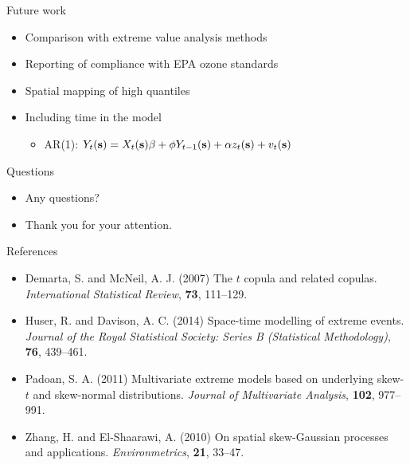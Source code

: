 \documentclass{beamer}
\begin{document}
\begin{frame}{Future work}
  \begin{itemize} \setlength{\itemsep}{0.5em}
    \item Comparison with extreme value analysis methods
    \item Reporting of compliance with EPA ozone standards
    \item Spatial mapping of high quantiles
    \item Including time in the model
    \begin{itemize}
      \item AR(1): $Y_t(\mbox{\bf s}) = X_t(\mbox{\bf s}) \beta + \phi Y_{t-1}(\mbox{\bf s}) + \alpha z_t(\mbox{\bf s}) + v_t(\mbox{\bf s})$
    \end{itemize}
  \end{itemize}
\end{frame}

\begin{frame}{Questions}
  \begin{itemize} \setlength{\itemsep}{0.5em}
    \item Any questions?
    \item Thank you for your attention.
  \end{itemize}
\end{frame}

\begin{frame}{References}
  \begin{itemize} \setlength{\itemsep}{0.5em}
    \item Demarta, S. and McNeil, A. J. (2007) The $t$ copula and related copulas. {\it International Statistical Review}, {\bf 73}, 111--129.
    \item Huser, R. and Davison, A. C. (2014) Space-time modelling of extreme events. {\it Journal of the Royal Statistical Society: Series B (Statistical Methodology)}, {\bf 76}, 439--461.
    \item Padoan, S. A. (2011) Multivariate extreme models based on underlying skew-$t$ and skew-normal distributions. {\it Journal of Multivariate Analysis}, {\bf 102}, 977--991.
    \item Zhang, H. and El-Shaarawi, A. (2010) On spatial skew-Gaussian processes and applications. {\it Environmetrics}, {\bf 21}, 33--47.
  \end{itemize}
\end{frame}
\end{document}
